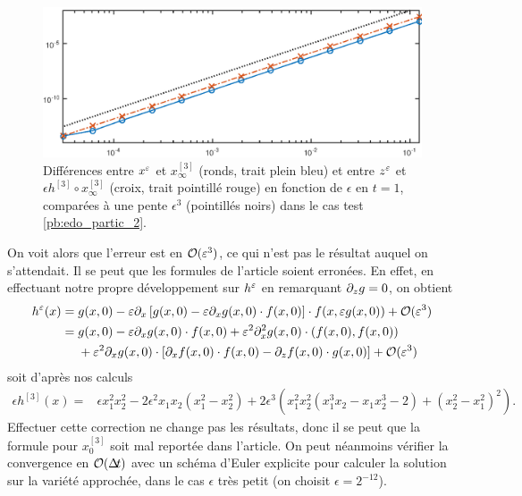 \begin{figure}[!h]
\centering
\includegraphics[width=.9\textwidth]{img/ann/erreur_manifold_approx.eps}
\caption{Différences entre $x^{\varepsilon}$ et $x^{[3]}_{\infty}$ (ronds, trait plein bleu) et entre $z^{\varepsilon}$ et $\epsilon h^{[3]}\circ x^{[3]}_{\infty}$ (croix, trait pointillé rouge) en fonction de $\epsilon$ en $t=1$, comparées à une pente $\epsilon^3$ (pointillés noirs) dans le cas test \eqref{pb:edo_partic_2}.}
\end{figure}
On voit alors que l'erreur est en $\mathcal{O}(\varepsilon^3)$, ce qui n'est pas le résultat auquel on s'attendait. 
Il se peut que les formules de l'article soient erronées. 
En effet, en effectuant notre propre développement sur $h^{\varepsilon}$ en remarquant $\partial_{z} g = 0$, on obtient 
\begin{align*}
h^{\varepsilon}(x) ={}& g(x,0) - \varepsilon \partial_{x} \left[ g(x,0) - \varepsilon \partial_{x} g(x,0)\cdot f(x,0) \right] \cdot f(x,\varepsilon g(x,0)) + \mathcal{O}(\varepsilon^3) \\
={}& g(x,0) - \varepsilon \partial_{x} g(x,0)\cdot f(x,0) + \varepsilon^2 \partial_{x}^2 g(x,0)\cdot (f(x,0),f(x,0)) 
\\ & + \varepsilon^2 \partial_{x} g(x,0)\cdot[ \partial_{x} f(x,0)\cdot f(x,0) - \partial_{z} f(x,0)\cdot g(x,0)] + \mathcal{O}(\varepsilon^3) 
\end{align*} 
soit d'après nos calculs 
\begin{align*}
\epsilon h^{[3]}(x) ={}& \epsilon x_1^2x_2^2 - 2\epsilon^2 x_1x_2(x_1^2-x_2^2) + 2\epsilon^3 \left( x_1^2 x_2^2(x_1^3 x_2 - x_1 x_2^3 - 2) + (x_2^2-x_1^2)^2 \right). 
\end{align*}
Effectuer cette correction ne change pas les résultats, donc il se peut que la formule pour $x_0^{[3]}$ soit mal reportée dans l'article. 
On peut néanmoins vérifier la convergence en $\mathcal{O}(\Delta\!\!\!\ t)$ avec un schéma d'Euler explicite pour calculer la solution sur la variété approchée, dans le cas $\epsilon$ très petit (on choisit $\epsilon = 2^{-12}$). 
